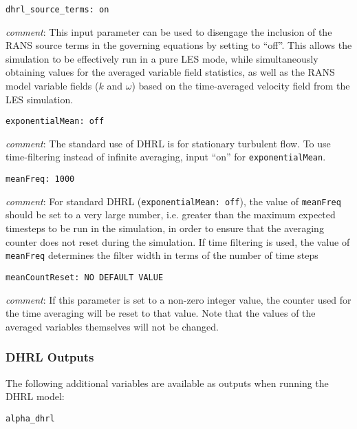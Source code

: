 \begin{verbatim}
dhrl_source_terms: on 
\end{verbatim}

{\it comment}: This input parameter can be used to disengage the
inclusion of the RANS source terms in the governing equations by
setting to ``off''. This allows the simulation to be effectively run in
a pure LES mode, while simultaneously obtaining values for the
averaged variable field statistics, as well as the RANS model variable
fields ($k$ and $\omega$) based on the time-averaged velocity field
from the LES simulation.

\begin{verbatim}
exponentialMean: off
\end{verbatim}

{\it comment}: The standard use of DHRL is for stationary turbulent
flow. To use time-filtering instead of infinite averaging, input ``on''
for {\tt exponentialMean}.

\begin{verbatim}
meanFreq: 1000
\end{verbatim}

{\it comment}: For standard DHRL ({\tt exponentialMean: off}), the value of
{\tt meanFreq} should be set to a very large number, i.e. greater than the
maximum expected timesteps to be run in the simulation, in order to
ensure that the averaging counter does not reset during the
simulation. If time filtering is used, the value of {\tt meanFreq}
determines the filter width in terms of the number of time steps

\begin{verbatim}
meanCountReset: NO DEFAULT VALUE
\end{verbatim}

{\it comment}: If this parameter is set to a non-zero integer value,
the counter used for the time averaging will be reset to that
value. Note that the values of the averaged variables themselves will
not be changed.


\subsubsection{DHRL Outputs}

The following additional variables are available as outputs when running the DHRL model:

\begin{verbatim}
alpha_dhrl
\end{verbatim}

